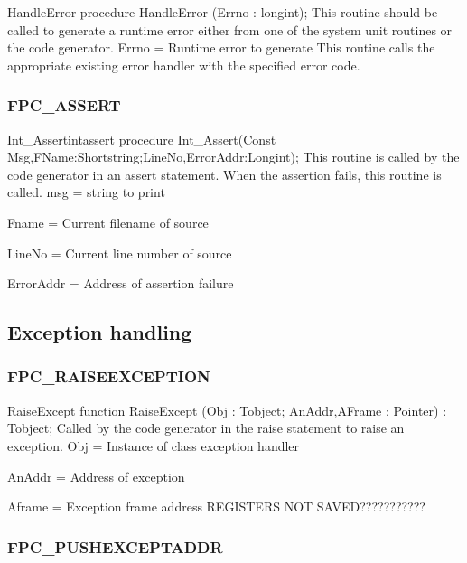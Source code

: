 \documentclass [12pt]{article}
\begin{document}
\begin{procedure}{HandleError}
\Declaration
procedure HandleError (Errno : longint);
\Description 
This routine should be called to generate a runtime error either from one of
the system unit routines or the code generator.
\Parameters 
Errno = Runtime error to generate 
\Notes 
This routine calls the appropriate existing error handler with the specified
error code.
\Algorithm 
\end{procedure}

\subsubsection{FPC{\_}ASSERT}
\label{subsubsec:mylabel59}

\begin{procedurel}{Int{\_}Assert}{intassert}
\Declaration
procedure Int{\_}Assert(Const Msg,FName:Shortstring;LineNo,ErrorAddr:Longint);
\Description 
This routine is called by the code generator in an assert statement. When
the assertion fails, this routine is called.
\Parameters  
msg = string to print  \par 
Fname = Current filename of source \par 
LineNo = Current line number of source \par 
ErrorAddr = Address of assertion failure 
\end{procedurel}

\subsection{Exception handling}
\label{subsec:exception}

\subsubsection{FPC{\_}RAISEEXCEPTION}
\label{subsubsec:mylabel60}

\begin{function}{RaiseExcept}
\Declaration
function RaiseExcept (Obj : Tobject; AnAddr,AFrame : Pointer) : Tobject;
\Description 
Called by the code generator in the raise statement to raise an exception.  
\Parameters 
Obj = Instance of class exception handler \par 
AnAddr = Address of exception \par 
Aframe = Exception frame address 
\Notes 
REGISTERS NOT SAVED??????????? 
\end{function}

\subsubsection{FPC{\_}PUSHEXCEPTADDR}
\label{subsubsec:mylabel61}
\end{document}

